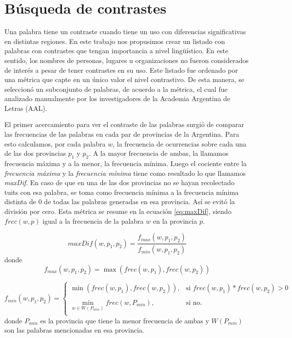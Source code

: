 \section{Búsqueda de contrastes}

Una palabra tiene un contraste cuando tiene un uso con diferencias significativas en
distintas regiones. En este trabajo nos propusimos crear un listado con palabras con contrastes que tengan
importancia a nivel lingüístico. En este sentido, los nombres de personas, lugares u organizaciones no 
fueron considerados de interés a pesar de tener contrastes en su uso.
Este listado fue ordenado por una métrica que capte en un único valor el nivel contrastivo. De esta manera, 
se seleccionó un subconjunto de palabras, de acuerdo a la métrica, el cual fue analizado manualmente por los investigadores de la Academia Argentina de Letras (AAL).

El primer acercamiento para ver el contraste de las palabras surgió de comparar las frecuencias de las palabras 
en cada par de provincias de la Argentina. Para esto calculamos, por cada palabra $w$, la frecuencia de ocurrencias sobre cada una de las dos provincias $p_1$ y $p_2$. A la mayor frecuencia de ambas, la llamamos frecuencia máxima y a la menor, la frecuencia mínima. Luego el cociente entre la \textit{frecuencia máxima} y la \textit{frecuencia mínima} tiene como resultado lo que llamamos \textit{maxDif}. En caso de que en una de las dos provincias no se hayan recolectado tuits con esa palabra, se toma como frecuencia mínima a la frecuencia mínima distinta de 0 de todas las palabras generadas en esa provincia. Así se evitó la división por cero. Esta métrica se resume en la ecuación \ref{eq:maxDif}, siendo $frec(w,p)$ igual a la frecuencia de la palabra $w$ en la provincia $p$.


\begin{equation}
  \label{eq:maxDif} 
  maxDif(w,p_1,p_2) = \frac{f_{max}(w,p_1,p_2)}{f_{min}(w,p_1,p_2)}
\end{equation}
donde 
\begin{equation}
f_{max}(w,p_1,p_2) = \max (frec(w,p_1),frec(w,p_2))
\end{equation}

\begin{equation}
 f_{min}(w,p_1,p_2) = \left\{ \begin{array}{lll}
             \min \left(frec\left(w,p_1\right),frec\left(w,p_2\right)\right), & \text{si } frec(w,p_1) * frec(w,p_2) > 0  & \\
             \\
             \min\limits_{w \in W(P_{min})} frec\left(w,P_{min}\right) , &  \text{si no.} &  \\
             \end{array}
   \right.
\end{equation}
   donde $P_{min}$ es la provincia que tiene la menor frecuencia de ambas y $W(P_{min})$ son las palabras mencionadas en esa provincia.



